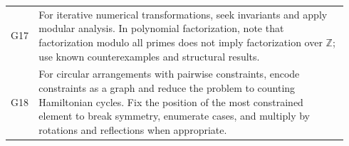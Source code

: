 \documentclass{article}
\theoremstyle{plain}
\theoremstyle{definition}
\theoremstyle{remark}
\begin{document}
\begin{table}[t]
\begin{tabular}{p{0.04\linewidth} p{0.9\linewidth}}
G17 & For iterative numerical transformations, seek invariants and apply modular analysis. In polynomial factorization, note that factorization modulo all primes does not imply factorization over \(\mathbb{Z}\); use known counterexamples and structural results. \\

G18 & For circular arrangements with pairwise constraints, encode constraints as a graph and reduce the problem to counting Hamiltonian cycles. Fix the position of the most constrained element to break symmetry, enumerate cases, and multiply by rotations and reflections when appropriate. \\
\bottomrule
\end{tabular}
\end{table}
\end{document}
